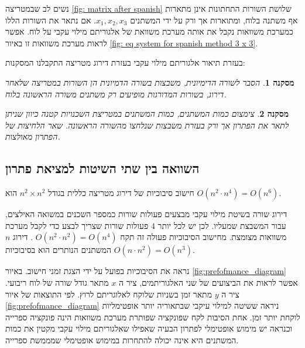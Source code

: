 \documentclass[12pt,leqno]{article}
\theoremstyle{theoremdd}
\newtheorem{corollary}{מסקנה}[section]
\begin{document}
נשים לב שבמטריצה 
\ref{fig: matrix after spanish}
שלושת השורות התחתונות
אינן מתארות אף משתנה בלוח, ומתוארות אך ורק על 
ידי 
המשתנים 
$x_1, x_2, x_3$.
אם נתאר את השורות הללו כמערכת משוואות נקבל
את אותה מערכת משוואת 
של אלגוריתם מילוי עקבי על לוח.
אפשר לראות מערכת משוואות זו באיור 
\ref{fig: eq system for spanish method 3 x 3}.

בעזרת תיאור
אלגוריתם מילוי עקבי 
בעזרת דירוג מטריצה
התקבלנו המסקנות:
\begin{corollary}
    הסבר לשורה הדימיונית,
    משבצות בשורה הדמיונית 
    הן השורות במטריצה
    שלאחר דירוג,
    בשורות המדורגות מופיעים רק משתנים משורה הראשונה בלוח.
\end{corollary}
\begin{corollary}
    צימצום כמות המשתנים,
    כמות המשתנים במטריצת השכנויות
    קטנה
    כיוון 
    שניתן לתאר את הפתרון אך ורק 
    בעזרת משבצות שנלחצו מהשורה הראשונה.
    שאר הלחיצות של הפתרון מאולצות.
\end{corollary}

\subsection{השוואה בין שתי השיטות למציאת פתרון}
חישוב סיבוכיות
של דירוג מטריצה 
כללית
בגודל 
$n^2 \times n^2$
הוא 
$O(n^2 \cdot n^4) = O(n^6)$.

דירוג שורה בשיטת מילוי עקבי 
מבצעים פעולות שורות כמספר השכנים במשואה האילצים,
עבור המשבצת שמעליו.
לכן יש לכל יותר
$4$
פעולות שורות שצריך לבצע
כדי לקבל מערכת משוואות מצומצת.
מחישוב הסיבוכיות 
פעולה  זה תקח
$O(n^2 \cdot n^2) = O(n^4)$
.
דירוג
$n$
המשתנים  
הנותרים
הוא בסיבוכיות 
$O(n \cdot n^2) = O (n^3)$.

נראה את הסיבוכיות בפועל על ידי הצגת זמני חישוב.
באיור 
\ref{fig:prefofmance_diagram}
אפשר לראות את הביצועים
של שני האלגוריתמים, ציר 
ה
$x$
מתאר
גודל שורה של לוח ריבועי.
ציר ה
$y$
מתאר
זמן 
בשניות
שלוקח לאלוגריתם לרוץ.
לפי התוצאות של איור 
\ref{fig:prefofmance_diagram}
ניראה 
ששיטה למילוי עיקבי שבתאוריה יותר אופטימליות לוקחת יותר זמן.
אחת הסיבות לקח 
שפונקציה שפותרת מערכת משוואות הינה פונקציה ספרייה
וכנראה יש מימוש אופטימלי לפתרון הבעיה שאפילו 
שאלגוריתם מילוי עקבי מקטין את כמות 
המשתנים היא אינה יכולה להתחרות במימוש אופטימלי שמממשת ספרייה.
\end{document}
